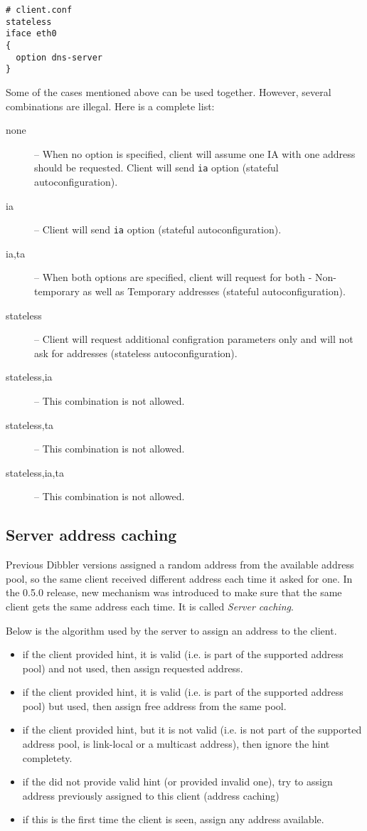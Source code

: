 \begin{lstlisting}
# client.conf
stateless
iface eth0
{
  option dns-server
}
\end{lstlisting}

Some of the cases mentioned above can be used together. However,
several combinations are illegal. Here is a complete list:

\begin{description}
\item[none] -- When no option is specified, client will assume one IA
  with one address should be requested. Client will send \verb+ia+
  option (stateful autoconfiguration).
\item[ia] -- Client will send \verb+ia+ option (stateful
  autoconfiguration).
\item[ia,ta] -- When both options are specified, client will request
  for both - Non-temporary as well as Temporary addresses (stateful
  autoconfiguration).
\item[stateless] -- Client will request additional configration
  parameters only and will not ask for addresses (stateless
  autoconfiguration).
\item[stateless,ia] -- This combination is not allowed.
\item[stateless,ta] -- This combination is not allowed.
\item[stateless,ia,ta] -- This combination is not allowed.
\end{description}

\subsection{Server address caching}
Previous Dibbler versions assigned a random address from the available
address pool, so the same client received different address each time it
asked for one. In the 0.5.0 release, new mechanism was introduced
to make sure that the same client gets the same address each time. It is
called \emph{Server caching}.

Below is the algorithm used by the server to assign an address to the client.

\begin{itemize}
 \item if the client provided hint, it is valid (i.e. is part of the
       supported address pool) and not used, then assign requested address.
 \item if the client provided hint, it is valid (i.e. is part of the
       supported address pool) but used, then assign free address from
       the same pool.
 \item if the client provided hint, but it is not valid (i.e. is not
       part of the supported address pool, is link-local or a multicast
       address), then ignore the hint completety.
 \item if the did not provide valid hint (or provided invalid one), try
       to assign address previously assigned to this client (address caching)
 \item if this is the first time the client is seen, assign any address
       available.
\end{itemize}


